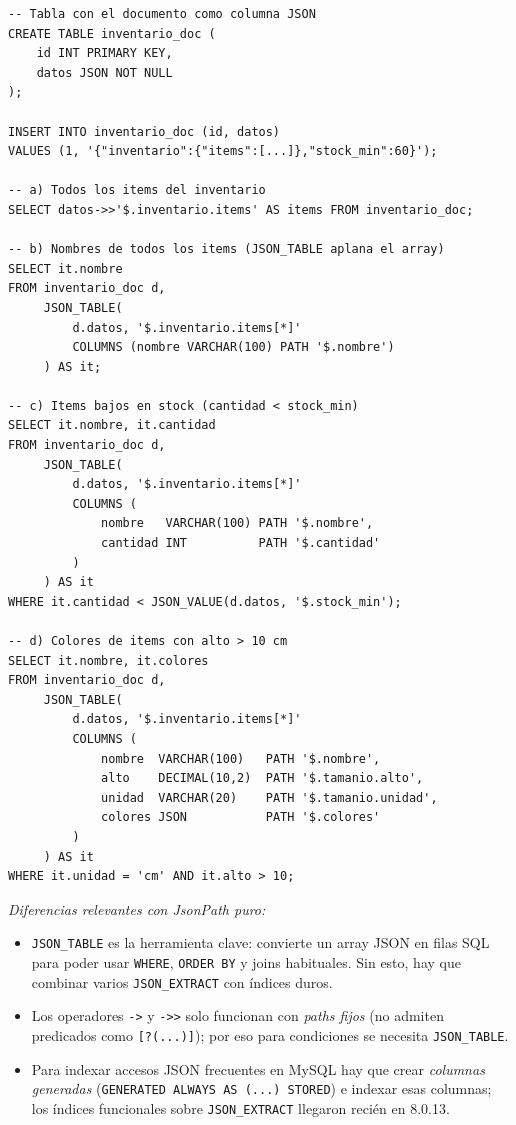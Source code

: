 \documentclass[11pt,a4paper]{article}
\begin{document}
\begin{lstlisting}[style=sqlstyle]
-- Tabla con el documento como columna JSON
CREATE TABLE inventario_doc (
    id INT PRIMARY KEY,
    datos JSON NOT NULL
);

INSERT INTO inventario_doc (id, datos)
VALUES (1, '{"inventario":{"items":[...]},"stock_min":60}');

-- a) Todos los items del inventario
SELECT datos->>'$.inventario.items' AS items FROM inventario_doc;

-- b) Nombres de todos los items (JSON_TABLE aplana el array)
SELECT it.nombre
FROM inventario_doc d,
     JSON_TABLE(
         d.datos, '$.inventario.items[*]'
         COLUMNS (nombre VARCHAR(100) PATH '$.nombre')
     ) AS it;

-- c) Items bajos en stock (cantidad < stock_min)
SELECT it.nombre, it.cantidad
FROM inventario_doc d,
     JSON_TABLE(
         d.datos, '$.inventario.items[*]'
         COLUMNS (
             nombre   VARCHAR(100) PATH '$.nombre',
             cantidad INT          PATH '$.cantidad'
         )
     ) AS it
WHERE it.cantidad < JSON_VALUE(d.datos, '$.stock_min');

-- d) Colores de items con alto > 10 cm
SELECT it.nombre, it.colores
FROM inventario_doc d,
     JSON_TABLE(
         d.datos, '$.inventario.items[*]'
         COLUMNS (
             nombre  VARCHAR(100)   PATH '$.nombre',
             alto    DECIMAL(10,2)  PATH '$.tamanio.alto',
             unidad  VARCHAR(20)    PATH '$.tamanio.unidad',
             colores JSON           PATH '$.colores'
         )
     ) AS it
WHERE it.unidad = 'cm' AND it.alto > 10;
\end{lstlisting}

\textit{Diferencias relevantes con JsonPath puro:}

\begin{itemize}
    \item \texttt{JSON\_TABLE} es la herramienta clave: convierte un array JSON en filas SQL para poder usar \texttt{WHERE}, \texttt{ORDER BY} y joins habituales. Sin esto, hay que combinar varios \texttt{JSON\_EXTRACT} con índices duros.
    \item Los operadores \texttt{->} y \texttt{->>} solo funcionan con \emph{paths fijos} (no admiten predicados como \texttt{[?(...)]}); por eso para condiciones se necesita \texttt{JSON\_TABLE}.
    \item Para indexar accesos JSON frecuentes en MySQL hay que crear \emph{columnas generadas} (\texttt{GENERATED ALWAYS AS (...) STORED}) e indexar esas columnas; los índices funcionales sobre \texttt{JSON\_EXTRACT} llegaron recién en 8.0.13.
\end{itemize}
\end{document}
